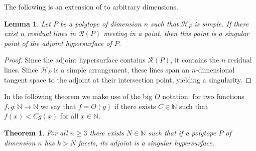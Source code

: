 \documentclass[a4paper,10pt]{amsart}
\theoremstyle{definition}
\theoremstyle{plain}
\newtheorem{thm}[Def]{Theorem}
\newtheorem{lem}[Def]{Lemma}
\newcommand{\N}{{\mathbb N}}
\begin{document}
The following is an extension of  to arbitrary dimensions.
\begin{lem}\label{lem:nlines_sing}
    Let $P$ be a polytope of dimension $n$ such that $\mathcal{H}_P$ is simple. If there exist $n$ residual lines in $\mathcal{R}(P)$ meeting in a point, then this point is a singular point of the adjoint hypersurface of $P$.
\end{lem}

\begin{proof}
    Since the adjoint hypersurface contains $\mathcal{R}(P)$, it contains the $n$ residual lines. Since $\mathcal{H}_P$ is a simple arrangement, these lines span an $n$-dimensional tangent space to the adjoint at their intersection point, yielding a singularity.
\end{proof}

In the following theorem we make use of the big $O$ notation: for two functions $f,g\colon\mathbb{N}\to\mathbb{N}$ we say that $f=O(g)$ if there exists $C\in\mathbb{N}$ such that $f(x)<Cg(x)$ for all $x\in\mathbb{N}$. 

\begin{thm}  \label{thm:smoothness}
    For all $n\geq3$ there exists $N\in\N$ such that if a polytope $P$ of dimension $n$ has $k>N$ facets, its adjoint is a singular hypersurface.
\end{thm}
\end{document}
